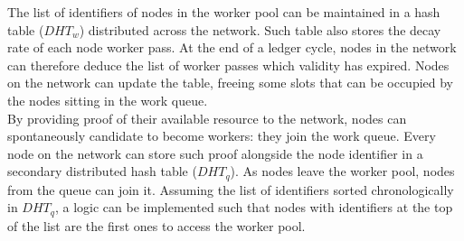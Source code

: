 The list of identifiers of nodes in the worker pool can be maintained in a  hash table ($DHT_w$) distributed across the network. Such table also stores the decay rate of each node worker pass. At the end of a ledger cycle, nodes in the network can therefore deduce the list of worker passes which validity has expired. Nodes on the network can update the table, freeing some slots that can be occupied by the nodes sitting in the work queue. \\

By providing proof of their available resource to the network, nodes can spontaneously candidate to become workers: they join the work queue. Every node on the network can store such proof alongside the node identifier in a secondary distributed hash table ($DHT_q$). As nodes leave the worker pool, nodes from the queue can join it. Assuming the list of identifiers sorted chronologically in $DHT_q$, a logic can be implemented such that nodes with identifiers at the top of the list are the first ones to access the worker pool. \\


